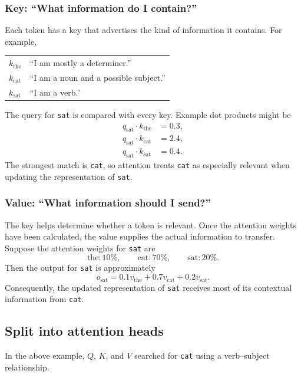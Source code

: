\subsubsection*{Key: ``What information do I contain?''}

Each token has a key that advertises the kind of information it contains. For
example,
\begin{center}
\begin{tabular}{@{}ll@{}}
\(k_{\text{the}}\) & ``I am mostly a determiner.'' \\
\(k_{\text{cat}}\) & ``I am a noun and a possible subject.'' \\
\(k_{\text{sat}}\) & ``I am a verb.''
\end{tabular}
\end{center}

The query for \texttt{sat} is compared with every key. Example dot products
might be
\begin{align*}
  q_{\text{sat}}\mathbin{\cdot}k_{\text{the}} &= 0.3,\\
  q_{\text{sat}}\mathbin{\cdot}k_{\text{cat}} &= 2.4,\\
  q_{\text{sat}}\mathbin{\cdot}k_{\text{sat}} &= 0.4.
\end{align*}
The strongest match is \texttt{cat}, so attention treats \texttt{cat} as
especially relevant when updating the representation of \texttt{sat}.

\subsubsection*{Value: ``What information should I send?''}

The key helps determine whether a token is relevant. Once the attention
weights have been calculated, the value supplies the actual information to
transfer. Suppose the attention weights for \texttt{sat} are
\[
  \text{the}:10\%, \qquad
  \text{cat}:70\%, \qquad
  \text{sat}:20\%.
\]
Then the output for \texttt{sat} is approximately
\[
  o_{\text{sat}}
  =0.1v_{\text{the}}+0.7v_{\text{cat}}+0.2v_{\text{sat}}.
\]
Consequently, the updated representation of \texttt{sat} receives most of its
contextual information from \texttt{cat}.

\subsection{Split into attention heads}

In the above example, \(Q\), \(K\), and \(V\) searched for \texttt{cat} using a
verb--subject relationship.

